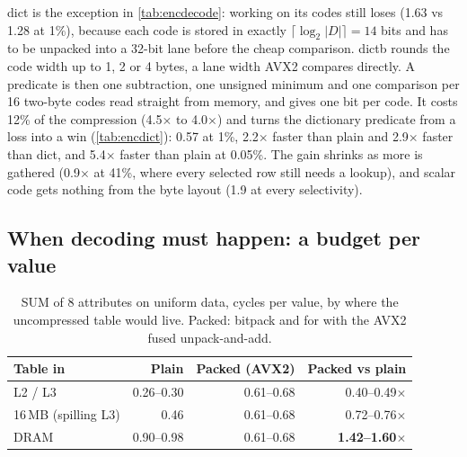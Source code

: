 dict is the exception in \cref{tab:encdecode}: working on its codes still loses (1.63 vs
1.28\ms{} at 1\%), because each code is stored in exactly $\lceil\log_2 |D|\rceil = 14$ bits and
has to be unpacked into a 32-bit lane before the cheap comparison. dictb rounds the code width
up to 1, 2 or 4 bytes, a lane width AVX2 compares directly. A predicate is then one
subtraction, one unsigned minimum and one comparison per 16 two-byte codes read straight from
memory, and  gives one bit per code. It costs 12\% of the compression
(4.5$\times$ to 4.0$\times$) and turns the dictionary predicate from a loss into a win
(\cref{tab:encdict}): 0.57\ms{} at 1\%, 2.2$\times$ faster than plain and 2.9$\times$ faster
than dict, and 5.4$\times$ faster than plain at 0.05\%. The gain shrinks as more is gathered
(0.9$\times$ at 41\%, where every selected row still needs a lookup), and scalar code gets
nothing from the byte layout (1.9\ms{} at every selectivity).

\subsection{When decoding must happen: a budget per value}
\label{sec:enc:budget}

\begin{table}[t]
\centering\small
\caption{SUM of 8 attributes on uniform data, cycles per value, by where the uncompressed table
would live. Packed: bitpack and for with the AVX2 fused unpack-and-add.}
\label{tab:budget}
\begin{tabular}{lrrr}
\toprule
Table in & Plain & Packed (AVX2) & Packed vs plain \\
\midrule
L2 / L3 & 0.26--0.30 & 0.61--0.68 & 0.40--0.49$\times$ \\
16\,MB (spilling L3) & 0.46 & 0.61--0.68 & 0.72--0.76$\times$ \\
DRAM & 0.90--0.98 & 0.61--0.68 & \textbf{1.42--1.60$\times$} \\
\bottomrule
\end{tabular}
\end{table}

